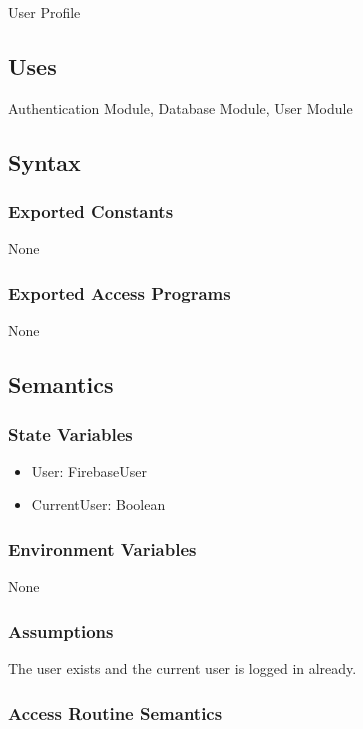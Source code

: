 \documentclass[12pt, titlepage]{article}
\begin{document}
User Profile

\subsection{Uses}

Authentication Module, Database Module, User Module

\subsection{Syntax}

\subsubsection{Exported Constants}

None

\subsubsection{Exported Access Programs}

None

\subsection{Semantics}

\subsubsection{State Variables}

\begin{itemize}
\item User: FirebaseUser
\item CurrentUser: Boolean
\end{itemize}

\subsubsection{Environment Variables}

None

\subsubsection{Assumptions}

The user exists and the current user is logged in already.

\subsubsection{Access Routine Semantics}
\end{document}
